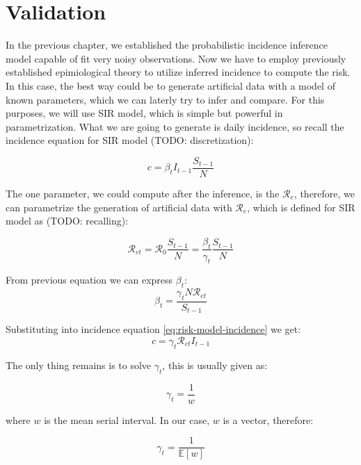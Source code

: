 \documentclass[
  digital, %
  oneside, %
  lof,     %
  lot,     %
]{fithesis4}
\begin{document}
\section{Validation}

In the previous chapter, we established the probabilistic
incidence inference model capable of fit very noisy observations.
Now we have to employ previously established epimiological theory
to utilize inferred incidence to compute the risk.
In this case, the best way could be to generate artificial data
with a model of known parameters, which we can laterly try to
infer and compare.
For this purposes, we will use SIR model, which is simple 
but powerful in parametrization.
What we are going to generate is daily incidence, so recall 
the incidence equation for SIR model (TODO: discretization):

\begin{equation}
  \label{eq:risk-model-incidence}
  c = \beta_t I_{t-1} \frac{S_{t-1}}{N}
\end{equation}

The one parameter, we could compute after the inference, 
is the $\mathcal{R}_e$, therefore, we can parametrize 
the generation of artificial data with $\mathcal{R}_e$, which
is defined for SIR model as (TODO: recalling):

\begin{equation}\label{eq:risk-model-rt}
\mathcal{R}_{et} = \mathcal{R}_0 \frac{S_{t-1}}{N} = \frac{\beta_t}{\gamma_t} \frac{S_{t-1}}{N}
\end{equation}

From previous equation we can express $\beta_t$:
\begin{equation}
\beta_t = \frac{\gamma_t N \mathcal{R}_{et}}{S_{t-1}}
\end{equation}

Substituting into incidence equation \eqref{eq:risk-model-incidence} we get:
\begin{equation}
  c = \gamma_t \mathcal{R}_{et} I_{t-1}
\end{equation}

The only thing remains is to solve $\gamma_t$, this is usually given as:

\begin{equation}
  \gamma_t = \frac{1}{w}
\end{equation}

where $w$ is the mean serial interval. In our case, $w$ is a vector, therefore:

\begin{equation}
  \gamma_t = \frac{1}{\mathbb{E}[w]}
\end{equation}
\end{document}
